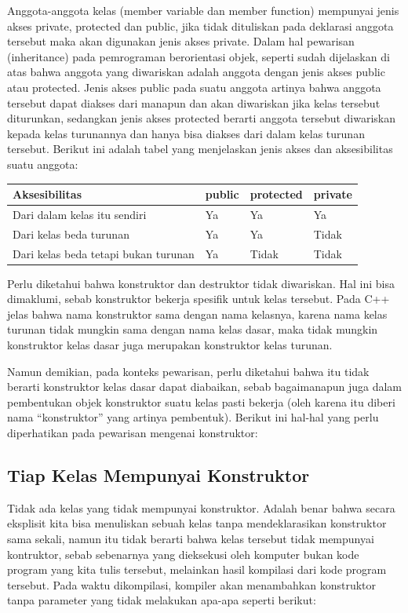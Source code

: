 Anggota-anggota kelas (member variable dan member function) mempunyai
jenis akses private, protected dan public, jika tidak dituliskan pada
deklarasi anggota tersebut maka akan digunakan jenis akses private.
Dalam hal pewarisan (inheritance) pada pemrograman berorientasi objek,
seperti sudah dijelaskan di atas bahwa anggota yang diwariskan adalah
anggota dengan jenis akses public atau protected. Jenis akses public
pada suatu anggota artinya bahwa anggota tersebut dapat diakses dari
manapun dan akan diwariskan jika kelas tersebut diturunkan, sedangkan
jenis akses protected berarti anggota tersebut diwariskan kepada kelas
turunannya dan hanya bisa diakses dari dalam kelas turunan tersebut.
Berikut ini adalah tabel yang menjelaskan jenis akses dan aksesibilitas
suatu anggota:

\begin{longtable}[]{@{}llll@{}}
\toprule
Aksesibilitas & public & protected & private\tabularnewline
\midrule
\endhead
Dari dalam kelas itu sendiri & Ya & Ya & Ya\tabularnewline
Dari kelas beda turunan & Ya & Ya & Tidak\tabularnewline
Dari kelas beda tetapi bukan turunan & Ya & Tidak & Tidak\tabularnewline
\bottomrule
\end{longtable}

Perlu diketahui bahwa konstruktor dan destruktor tidak diwariskan. Hal
ini bisa dimaklumi, sebab konstruktor bekerja spesifik untuk kelas
tersebut. Pada C++ jelas bahwa nama konstruktor sama dengan nama
kelasnya, karena nama kelas turunan tidak mungkin sama dengan nama kelas
dasar, maka tidak mungkin konstruktor kelas dasar juga merupakan
konstruktor kelas turunan.

Namun demikian, pada konteks pewarisan, perlu diketahui bahwa itu tidak
berarti konstruktor kelas dasar dapat diabaikan, sebab bagaimanapun juga
dalam pembentukan objek konstruktor suatu kelas pasti bekerja (oleh
karena itu diberi nama ``konstruktor'' yang artinya pembentuk). Berikut
ini hal-hal yang perlu diperhatikan pada pewarisan mengenai konstruktor:

\subsection{Tiap Kelas Mempunyai
Konstruktor}\label{tiap-kelas-mempunyai-konstruktor}

Tidak ada kelas yang tidak mempunyai konstruktor. Adalah benar bahwa
secara eksplisit kita bisa menuliskan sebuah kelas tanpa mendeklarasikan
konstruktor sama sekali, namun itu tidak berarti bahwa kelas tersebut
tidak mempunyai kontruktor, sebab sebenarnya yang dieksekusi oleh
komputer bukan kode program yang kita tulis tersebut, melainkan hasil
kompilasi dari kode program tersebut. Pada waktu dikompilasi, kompiler
akan menambahkan konstruktor tanpa parameter yang tidak melakukan
apa-apa seperti berikut:

